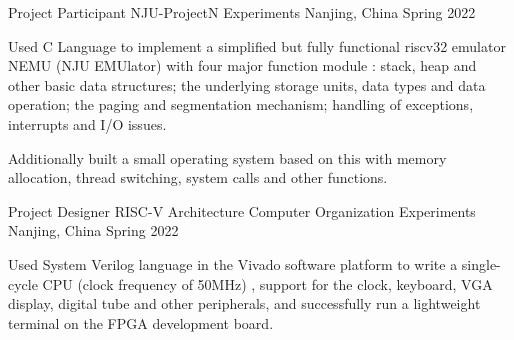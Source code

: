 

\begin{cventries}

  \cventry
    {Project Participant} %
    {NJU-ProjectN Experiments} %
    {Nanjing, China} %
    {Spring 2022} %
    {
      \begin{cvitems} %
        \item {Used C Language to implement a simplified but fully functional riscv32 emulator NEMU (NJU EMUlator) with
        four major function module : stack, heap and other basic data structures; the underlying storage units, data types
        and data operation; the paging and segmentation mechanism; handling of exceptions, interrupts and I/O issues.}
        \item {Additionally built a small operating system based on this with memory allocation, thread switching, system calls
        and other functions.}
      \end{cvitems}
    }

  \cventry
    {Project Designer} %
    {RISC-V Architecture Computer Organization Experiments} %
    {Nanjing, China} %
    {Spring 2022} %
    {
      \begin{cvitems} %
        \item {Used System Verilog language in the Vivado software platform to write a single-cycle CPU (clock frequency of 50MHz) , support for the clock, keyboard, VGA display, digital tube and other peripherals, and successfully run a lightweight terminal on the FPGA development board.}
      \end{cvitems}
    }


\end{cventries}
